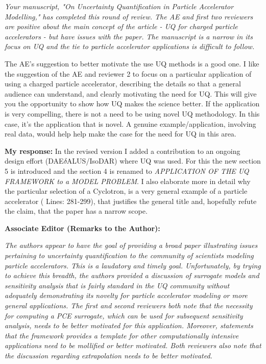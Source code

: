 \documentclass{article}
\newcommand{\atline}[1]{\color{red} Lines: #1\color{blue}}
\begin{document}
{\it Your manuscript, "On Uncertainty Quantification in Particle Accelerator Modelling," has completed this round of review. The AE and first two reviewers are positive about the main concept of the article - UQ for charged particle accelerators - but have issues with the paper. The manuscript is a narrow in its focus on UQ and the tie to particle accelerator applications is difficult to follow. 

The AE's suggestion to better motivate the use UQ methods is a good one. I like the suggestion of the AE and reviewer 2 to focus on a particular application of using a charged particle accelerator, describing the details so that a general audience can understand, and clearly motivating the need for UQ. This will give you the opportunity to show how UQ makes the science better. If the application is very compelling, there is not a need to be using novel UQ methodology. In this case, it's the application that is novel. A genuine example/application, involving real data, would help help make the case for the need for UQ in this area. }

{\bf My response: }{\color{blue} In the revised version I added a contribution to an ongoing design effort (DAE$\delta$ALUS/IsoDAR) where UQ was used. For this the new section 5 is introduced and the section 4 is renamed to {\em APPLICATION OF THE UQ FRAMEWORK to a MODEL PROBLEM}. I also elaborate more in detail why the 
particular selection of a Cyclotron, is a very general example of a particle accelerator (\atline{281-299}), that justifies the general title and, hopefully refute the claim, that the paper has a  narrow scope.}


{\bf Associate Editor (Remarks to the Author): }

{\it The authors appear to have the goal of providing a broad paper illustrating issues pertaining to uncertainty quantification to the community of scientists modeling particle accelerators. This is a laudatory and timely goal.
Unfortunately, by trying to achieve this breadth, the authors provided a discussion of surrogate models and sensitivity analysis that is fairly standard in the UQ community without adequately demonstrating its novelty for particle accelerator modeling or more general applications. The first and second reviewers both note that the necessity for computing a PCE surrogate, which can be used for subsequent sensitivity analysis, needs to be better motivated for this application. Moreover, statements that the framework provides a template for other computationally intensive applications need to be mollified or better motivated. Both reviewers also note that the discussion regarding extrapolation needs to be better motivated.}
\end{document}
